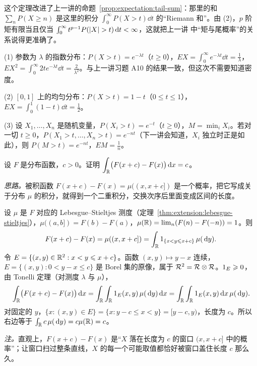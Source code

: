 这个定理改进了上一讲的命题~\ref{prop:expectation:tail-sum}：那里的和 $\sum_nP(X\geqslant n)$ 是这里的积分 $\int_0^\infty P(X>t)\dd t$ 的“Riemann 和”。由 (2)，$p$ 阶矩有限当且仅当 $\int_0^\infty t^{p-1}P(\lvert X\rvert>t)\,\mathrm{d} t<\infty$，这就把上一讲 中“矩与尾概率”的关系说得更准确了。

\begin{example}
(1) 参数为 $\lambda$ 的指数分布：$P(X>t)=e^{-\lambda t}$（$t\geqslant0$），$EX=\int_0^\infty e^{-\lambda t}\dd t=\frac1\lambda$，$EX^2=\int_0^\infty2te^{-\lambda t}\dd t=\frac2{\lambda^2}$。与上一讲习题 A10 的结果一致，但这次不需要知道密度。

(2) $[0,1]$ 上的均匀分布：$P(X>t)=1-t$（$0\leqslant t\leqslant1$），$EX=\int_0^1(1-t)\dd t=\frac12$。

(3) 设 $X_1,\dots,X_n$ 是随机变量，$P(X_i>t)=e^{-t}$（$t\geqslant0$），$M=\min_iX_i$。若对一切 $t\geqslant0$，$P(X_1>t,\dots,X_n>t)=e^{-nt}$（下一讲会知道，$X_i$ 独立时正是如此），则 $P(M>t)=e^{-nt}$，$EM=\frac1n$。
\end{example}

\begin{workedexample}\label{we:product:shift-integral}
设 $F$ 是分布函数，$c>0$。证明 $\displaystyle\int_{\mathbb{R}}\bigl(F(x+c)-F(x)\bigr)\,\mathrm{d} x=c$。
\end{workedexample}
\begin{solution}
\emph{思路。}被积函数 $F(x+c)-F(x)=\mu((x,x+c])$ 是一个概率，把它写成关于分布 $\mu$ 的积分，就得到一个二重积分，交换次序后里面变成区间的长度。

设 $\mu$ 是 $F$ 对应的 Lebesgue--Stieltjes 测度（定理~\ref{thm:extension:lebesgue-stieltjes}），$\mu((a,b])=F(b)-F(a)$，$\mu(\mathbb{R})=\lim_{n}(F(n)-F(-n))=1$。则
\[
F(x+c)-F(x)=\mu((x,x+c])=\int_{\mathbb{R}}1_{\{x<y\leqslant x+c\}}\,\mu(\,\mathrm{d} y).
\]
令 $E=\{(x,y)\in\mathbb{R}^2:x<y\leqslant x+c\}$。函数 $(x,y)\mapsto y-x$ 连续，$E=\{(x,y):0<y-x\leqslant c\}$ 是 Borel 集的原像，属于 $\mathcal{R}^2=\mathcal{R}\otimes\mathcal{R}$。$1_E\geqslant0$，由 Tonelli 定理（对测度 $\lambda$ 与 $\mu$），
\[
\int_{\mathbb{R}}\bigl(F(x+c)-F(x)\bigr)\,\mathrm{d} x=\int_{\mathbb{R}}\int_{\mathbb{R}}1_E(x,y)\,\mu(\,\mathrm{d} y)\,\mathrm{d} x=\int_{\mathbb{R}}\int_{\mathbb{R}}1_E(x,y)\,\mathrm{d} x\,\mu(\,\mathrm{d} y).
\]
对固定的 $y$，$\{x:(x,y)\in E\}=\{x:y-c\leqslant x<y\}=[y-c,y)$，长度为 $c$。所以右边等于 $\int_{\mathbb{R}} c\,\mu(\,\mathrm{d} y)=c\mu(\mathbb{R})=c$。

\emph{注。}直观上，$F(x+c)-F(x)$ 是“$X$ 落在长度为 $c$ 的窗口 $(x,x+c]$ 中的概率”；让窗口扫过整条直线，$X$ 的每一个可能取值都恰好被窗口盖住长度 $c$ 那么久。
\end{solution}

